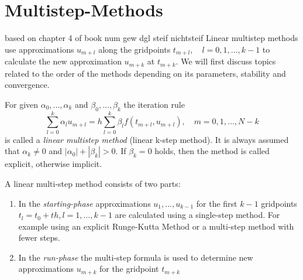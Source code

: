 	
		
	
			
\section{Multistep-Methods}
	based on chapter 4 of book num gew dgl steif nichtsteif \newline
	Linear multistep methods use approximations $u_{m+l}$ along the gridpoints $t_{m+l}, \quad l=0,1,...,k-1$ to calculate the new approximation $u_{m+k}$ at $t_{m+k}$. We will first discuss topics related to the order of the methods depending on its parameters, stability and convergence.
	
	\begin{definition}
		For given $\alpha_0, ..., \alpha_k$ and $\beta_0, ..., \beta_k$ the iteration rule
		\begin{equation}
			\label{linear-multistep-method}
			\sum_{l=0}^{k} \alpha_l u_{m+l} = h \sum_{l=0}^{k} \beta_l f(t_{m+l}, u_{m+l}), \quad m=0,1,...,N-k
		\end{equation}
		is called a \emph{linear multistep method} (linear k-step method). It is always assumed that $\alpha_k \neq 0$ and $|\alpha_0| + |\beta_k| > 0$. If $\beta_k=0$ holds, then the method is called explicit, otherwise implicit.
	\end{definition}
	
	A linear multi-step method consists of two parts:
	\begin{enumerate}
		\item In the \emph{starting-phase} approximations $u_1,...,u_{k-1}$ for the first $k-1$ gridpoints $t_l = t_0+th, l=1,...,k-1$ are calculated using a single-step method. For example using an explicit Runge-Kutta Method or a multi-step method with fewer steps.
		
		\item  In the \emph{run-phase} the multi-step formula is used to determine new approximations $u_{m+k}$ for the gridpoint $t_{m+k}$
	\end{enumerate}
	
